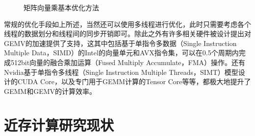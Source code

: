 \begin{figure}[htbp!]
	\centering
	\caption{矩阵向量乘基本优化方法}
	\label{GEMVBasic}
\end{figure}

常规的优化手段如上所述，当然还可以使用多线程进行优化，此时只需要考虑各个线程的数据划分和线程间的同步开销即可。除此之外有许多相关硬件被设计提出对GEMV的加速提供了支持，这其中包括基于单指令多数据（Single Instruction Multiple Data，SIMD）的Intel的向量单元和AVX指令集，可以在0.5个周期内完成512bit向量的融合乘加运算（Fused Multiply Accumulate，FMA）操作\cite{IntelAVX}。还有Nvidia基于单指令多线程（Single Instruction Multiple Threads，SIMT）模型设计的CUDA Core\cite{Cuda}，以及专门用于GEMM计算的Tensor Core\cite{TensorCore}等等，都极大地提升了GEMM和GEMV的计算效率。

\section{近存计算研究现状}

